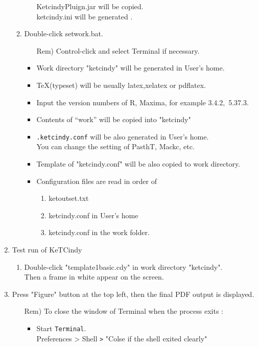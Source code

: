 \documentclass{article}
\begin{document}
\begin{enumerate}[\bf\large 1.]
\begin{enumerate}[(1)]
\begin{itemize}
    \hspace*{5mm}KetcindyPluign.jar will be copied.\\
    \hspace*{5mm}ketcindy.ini will be generated .
    \end{itemize}
    \item Double-click setwork.bat.
    \begin{itemize}
    \item[Rem)]Control-click and select Terminal if necessary. 
    \end{itemize}
    \begin{itemize}
    \item Work directory "ketcindy" will be generated in User's home.
    \item TeX(typeset) will be usually latex,xelatex or pdflatex.
    \item Input the version numbers of R, Maxima, for example 3.4.2,\ 5.37.3.
   \item Contents of “work” will be copied into "ketcindy"
    \item \verb|.ketcindy.conf| will be also generated in User's home.\\
    \hspace*{10mm}You can change the setting of PasthT, Mackc, etc.
    \item Template of "ketcindy.conf" will be also copied to work directory.
    \item Configuration files are read in order of 
      \begin{enumerate}[1)]
      \item ketoutset.txt
      \item ketcindy.conf in User's home
      \item ketcindy.conf in the work folder.
      \end{enumerate}
    \end{itemize}
  \end{enumerate}

\item Test run of KeTCindy
 \begin{enumerate}[(1)]
  \item Double-click "template1basic.cdy" in work directory "ketcindy".\\
  \hspace*{10mm}Then a frame in white appear on the screen.  \end{enumerate}
  \item Press "Figure" button at the top left, then the final PDF output is displayed. 
    \begin{itemize}
    \item[Rem)]To close the window of Terminal when the process exits :
      \begin{itemize}
      \item Start \verb|Terminal|.\\
      \hspace*{10mm}Preferences > Shell \verb|>| "Colse if the shell exited clearly"
      \end{itemize}
    \end{itemize} 


\end{enumerate}
\end{document}
